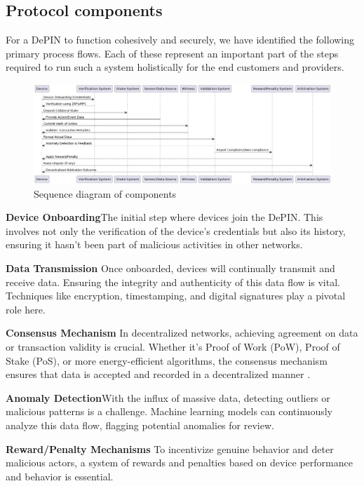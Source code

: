 \documentclass{article}
\begin{document}
\subsection{Protocol components}

For a DePIN to function cohesively and securely, we have identified the following primary process flows. Each of these represent an important part of the steps required to run such a system holistically for the end customers and providers. 

\begin{figure}[ht]
  \centering
  \includegraphics[scale=0.3]{diagram1}
  \caption{Sequence diagram of components}
\end{figure}

\textbf{Device Onboarding}The initial step where devices join the DePIN. This involves not only the verification of the device's credentials but also its history, ensuring it hasn't been part of malicious activities in other networks.

\textbf{Data Transmission} Once onboarded, devices will continually transmit and receive data. Ensuring the integrity and authenticity of this data flow is vital. Techniques like encryption, timestamping, and digital signatures play a pivotal role here.

\textbf{Consensus Mechanism} In decentralized networks, achieving agreement on data or transaction validity is crucial. Whether it's Proof of Work (PoW), Proof of Stake (PoS), or more energy-efficient algorithms, the consensus mechanism ensures that data is accepted and recorded in a decentralized manner \cite{merkle1987digital}.

\textbf{Anomaly Detection}With the influx of massive data, detecting outliers or malicious patterns is a challenge. Machine learning models can continuously analyze this data flow, flagging potential anomalies for review.

\textbf{Reward/Penalty Mechanisms} To incentivize genuine behavior and deter malicious actors, a system of rewards and penalties based on device performance and behavior is essential.
\end{document}
